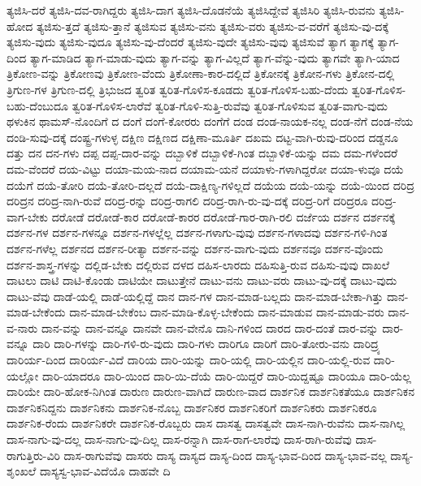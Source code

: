 {ತ್ಯಜಿಸಿ-ದರೆ
ತ್ಯಜಿಸಿ-ದವ-ರಾಗಿದ್ದರು
ತ್ಯಜಿಸಿ-ದಾಗ
ತ್ಯಜಿಸಿ-ದೊಡನೆಯೆ
ತ್ಯಜಿಸಿದ್ದೇವೆ
ತ್ಯಜಿಸಿರಿ
ತ್ಯಜಿಸಿ-ರುವನು
ತ್ಯಜಿಸಿ-ಹೋದ
ತ್ಯಜಿಸು-ತ್ತದೆ
ತ್ಯಜಿಸು-ತ್ತಾನೆ
ತ್ಯಜಿಸುವ
ತ್ಯಜಿಸು-ವನು
ತ್ಯಜಿಸು-ವರು
ತ್ಯಜಿಸು-ವ-ವರೆಗೆ
ತ್ಯಜಿಸು-ವು-ದಕ್ಕೆ
ತ್ಯಜಿಸು-ವುದು
ತ್ಯಜಿಸು-ವುದೂ
ತ್ಯಜಿಸು-ವು-ದೆಂದರೆ
ತ್ಯಜಿಸು-ವುದೇ
ತ್ಯಜಿಸು-ವುವು
ತ್ಯಜಿಸುವೆ
ತ್ಯಾಗ
ತ್ಯಾಗಕ್ಕೆ
ತ್ಯಾಗ-ದಿಂದ
ತ್ಯಾಗ-ಮಾಡಿದ
ತ್ಯಾಗ-ಮಾಡು-ವುದು
ತ್ಯಾಗ-ವನ್ನು
ತ್ಯಾಗ-ವಿಲ್ಲದೆ
ತ್ಯಾಗ-ವೆನ್ನು-ವುದು
ತ್ಯಾಗವೇ
ತ್ಯಾಗಿ-ಯಾದ
ತ್ರಿಕೋಣ-ವನ್ನು
ತ್ರಿಕೋಣವು
ತ್ರಿಕೋಣ-ವೆಂದು
ತ್ರಿಕೋಣಾ-ಕಾರ-ದಲ್ಲಿದೆ
ತ್ರಿಕೋನಕ್ಕೆ
ತ್ರಿಕೋನ-ಗಳು
ತ್ರಿಕೋನ-ದಲ್ಲಿ
ತ್ರಿಗುಣ-ಗಳ
ತ್ರಿಗುಣ-ದಲ್ಲಿ
ತ್ರಿಭುಜದ
ತ್ವರಿತ
ತ್ವರಿತ-ಗೊಳಿಸ-ಕೂಡದು
ತ್ವರಿತ-ಗೊಳಿಸ-ಬಹು-ದೆಂದು
ತ್ವರಿತ-ಗೊಳಿಸ-ಬಹು-ದೆಂಬುದೂ
ತ್ವರಿತ-ಗೊಳಿಸ-ಲಾರೆವೆ
ತ್ವರಿತ-ಗೊಳಿ-ಸುತ್ತಿ-ರುವೆವು
ತ್ವರಿತ-ಗೊಳಿಸುವ
ತ್ವರಿತ-ವಾಗು-ವುದು
ಥಳುಕಿನ
ಥಾಮಸ್-ನೊಂದಿಗೆ
ದ
ದಂಗೆ
ದಂಗೆ-ಕೋರರು
ದಂಗೆಗೆ
ದಂಡ
ದಂಡ-ನಾಯಕ-ನಲ್ಲ
ದಂಡ-ನೆಗೆ
ದಂಡ-ನೆಯ
ದಂಡಿ-ಸುವು-ದಕ್ಕೆ
ದಂಷ್ಟ್ರ-ಗಳುಳ್ಳ
ದಕ್ಷಿಣ
ದಕ್ಷಿಣದ
ದಕ್ಷಿಣಾ-ಮೂರ್ತಿ
ದಖಮ
ದಟ್ಟ-ವಾಗಿ-ರುವು-ದರಿಂದ
ದಡ್ಡನೂ
ದತ್ತು
ದನ
ದನ-ಗಳು
ದಪ್ಪ
ದಪ್ಪ-ದಾರ-ವನ್ನು
ದಬ್ಬಾಳಿಕೆ
ದಬ್ಬಾಳಿಕೆ-ಗಿಂತ
ದಬ್ಬಾಳಿಕೆ-ಯನ್ನು
ದಮ
ದಮ-ಗಳೆಂದರೆ
ದಮ-ವೆಂದರೆ
ದಯ-ವಿಟ್ಟು
ದಯಾ-ಮಯ-ನಾದ
ದಯಾಮ-ಯನೆ
ದಯಾಳು-ಗಳಾಗಿದ್ದರೋ
ದಯಾ-ಳುವೂ
ದಯೆ
ದಯೆಗೆ
ದಯೆ-ತೋರಿ
ದಯೆ-ತೋರಿ-ದಲ್ಲದೆ
ದಯೆ-ದಾಕ್ಷಿಣ್ಯ-ಗಳಿಲ್ಲದೆ
ದಯೆಯ
ದಯೆ-ಯನ್ನು
ದಯೆ-ಯಿಂದ
ದರಿದ್ರ
ದರಿದ್ರನ
ದರಿದ್ರ-ನಾಗಿ-ರುವೆ
ದರಿದ್ರ-ರನ್ನು
ದರಿದ್ರ-ರಾಗಲಿ
ದರಿದ್ರ-ರಾಗಿ-ರು-ವು-ದಕ್ಕೆ
ದರಿದ್ರ-ರಿಗೆ
ದರಿದ್ರರೂ
ದರಿದ್ರ-ವಾಗ-ಬೇಕು
ದರೋಡೆ
ದರೋಡೆ-ಕಾರ
ದರೋಡೆ-ಕಾರರ
ದರೋಡೆ-ಗಾರ-ರಾಗಿ-ರಲಿ
ದರ್ಜೆಯ
ದರ್ಶನ
ದರ್ಶನಕ್ಕೆ
ದರ್ಶನ-ಗಳ
ದರ್ಶನ-ಗಳನ್ನೂ
ದರ್ಶನ-ಗಳಲ್ಲೆಲ್ಲ
ದರ್ಶನ-ಗಳಾಗು-ವುವು
ದರ್ಶನ-ಗಳಾದವು
ದರ್ಶನ-ಗಳಿ-ಗಿಂತ
ದರ್ಶನ-ಗಳೆಲ್ಲ
ದರ್ಶನದ
ದರ್ಶನ-ರೀತ್ಯಾ
ದರ್ಶನ-ವನ್ನು
ದರ್ಶನ-ವಾಗು-ವುದು
ದರ್ಶನವೂ
ದರ್ಶನ-ವೊಂದು
ದರ್ಶನ-ಶಾಸ್ತ್ರ-ಗಳನ್ನು
ದಲ್ಲಿಡ-ಬೇಕು
ದಲ್ಲಿರುವ
ದಳದ
ದಹಿಸ-ಲಾರದು
ದಹಿಸುತ್ತಿ-ರುವ
ದಹಿಸು-ವುವು
ದಾಖಲೆ
ದಾಟಲು
ದಾಟಿ
ದಾಟಿ-ಕೊಂಡು
ದಾಟಿಯೇ
ದಾಟುತ್ತೇನೆ
ದಾಟು-ವನು
ದಾಟು-ವರು
ದಾಟು-ವು-ದಕ್ಕೆ
ದಾಟು-ವುದು
ದಾಟು-ವೆವು
ದಾಡೆ-ಯಲ್ಲಿ
ದಾಡೆ-ಯಲ್ಲಿದ್ದೆ
ದಾನ
ದಾನ-ಗಳ
ದಾನ-ಮಾಡ-ಬಲ್ಲದು
ದಾನ-ಮಾಡ-ಬೇಕಾ-ಗಿತ್ತು
ದಾನ-ಮಾಡ-ಬೇಕೆಂದು
ದಾನ-ಮಾಡ-ಬೇಕೆಂಬ
ದಾನ-ಮಾಡಿ-ಕೊಳ್ಳ-ಬೇಕೆಂದು
ದಾನ-ಮಾಡುವ
ದಾನ-ಮಾಡು-ವರು
ದಾನ-ವ-ನಾರು
ದಾನ-ವನ್ನು
ದಾನ-ವನ್ನೂ
ದಾನವೇ
ದಾನ-ವೇನೊ
ದಾನಿ-ಗಳಿಂದ
ದಾರದ
ದಾರ-ದಂತೆ
ದಾರ-ವನ್ನು
ದಾರ-ವನ್ನೂ
ದಾರಿ
ದಾರಿ-ಗಳನ್ನು
ದಾರಿ-ಗಳಿ-ರು-ವುದು
ದಾರಿ-ಗಳು
ದಾರಿಗೂ
ದಾರಿಗೆ
ದಾರಿ-ತೋರು-ವನು
ದಾರಿದ್ರ್ಯ
ದಾರಿರ್ಯ-ದಿಂದ
ದಾರಿರ್ಯ-ವಿದೆ
ದಾರಿಯ
ದಾರಿ-ಯನ್ನು
ದಾರಿ-ಯಲ್ಲಿ
ದಾರಿ-ಯಲ್ಲಿನ
ದಾರಿ-ಯಲ್ಲಿ-ರುವ
ದಾರಿ-ಯಲ್ಲೋ
ದಾರಿ-ಯಾದರೂ
ದಾರಿ-ಯಿಂದ
ದಾರಿ-ಯಿ-ದೆಯೆ
ದಾರಿ-ಯಿದ್ದರೆ
ದಾರಿ-ಯಿದ್ದಷ್ಟೂ
ದಾರಿಯೂ
ದಾರಿ-ಯೆಲ್ಲ
ದಾರಿಯೇ
ದಾರಿ-ಹೋಕ-ನಿಗಿಂತ
ದಾರುಣ
ದಾರುಣ-ವಾಗಿದೆ
ದಾರುಣ-ವಾದ
ದಾರ್ಶನಿಕ
ದಾರ್ಶನಿಕತೆಯೂ
ದಾರ್ಶನಿಕನ
ದಾರ್ಶನಿಕನಿದ್ದನು
ದಾರ್ಶನಿಕನು
ದಾರ್ಶನಿಕ-ನೊಬ್ಬ
ದಾರ್ಶನಿಕರ
ದಾರ್ಶನಿಕರಿಗೆ
ದಾರ್ಶನಿಕರು
ದಾರ್ಶನಿಕರೂ
ದಾರ್ಶನಿಕ-ರೆಂದು
ದಾರ್ಶನಿಕರೇ
ದಾರ್ಶನಿಕ-ರೊಬ್ಬರು
ದಾಸ
ದಾಸತ್ವ
ದಾಸತ್ವವೇ
ದಾಸ-ನಾಗಿ-ರುವೆನು
ದಾಸ-ನಾಗಿಲ್ಲ
ದಾಸ-ನಾಗು-ವು-ದಲ್ಲ
ದಾಸ-ನಾಗು-ವು-ದಿಲ್ಲ
ದಾಸ-ರನ್ನಾಗಿ
ದಾಸ-ರಾಗ-ಲಾರೆವು
ದಾಸ-ರಾಗಿ-ರುವೆವು
ದಾಸ-ರಾಗುತ್ತಿರು-ವಿರಿ
ದಾಸ-ರಾಗುವೆವು
ದಾಸರು
ದಾಸ್ಯ
ದಾಸ್ಯದ
ದಾಸ್ಯ-ದಿಂದ
ದಾಸ್ಯ-ಭಾವ-ದಿಂದ
ದಾಸ್ಯ-ಭಾವ-ವಲ್ಲ
ದಾಸ್ಯ-ಶೃಂಖಲೆ
ದಾಸ್ಯಸ್ವ-ಭಾವ-ವಿದೆಯೊ
ದಾಹವೇ
ದಿ
}
